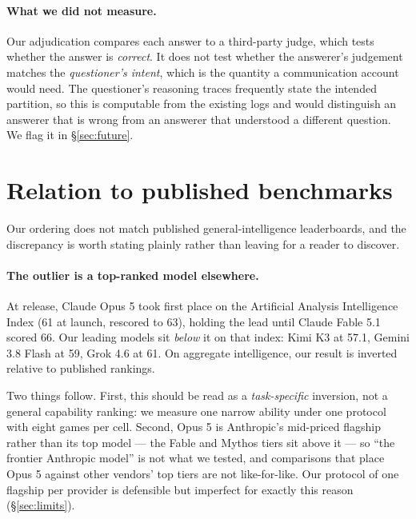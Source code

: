 \documentclass[11pt]{article}
\begin{document}
\paragraph{What we did not measure.} Our adjudication compares each answer to a
third-party judge, which tests whether the answer is \emph{correct}. It does not
test whether the answerer's judgement matches the \emph{questioner's intent},
which is the quantity a communication account would need. The questioner's
reasoning traces frequently state the intended partition, so this is computable
from the existing logs and would distinguish an answerer that is wrong from an
answerer that understood a different question. We flag it in
\S\ref{sec:future}.

\section{Relation to published benchmarks}
\label{sec:external}

Our ordering does not match published general-intelligence leaderboards, and
the discrepancy is worth stating plainly rather than leaving for a reader to
discover.

\paragraph{The outlier is a top-ranked model elsewhere.} At release, Claude Opus 5 took first place on the Artificial Analysis Intelligence Index
(61 at launch, rescored to 63), holding the lead until Claude Fable 5.1 scored
66. Our leading models sit \emph{below} it on that index: Kimi K3 at 57.1,
Gemini 3.8 Flash at 59, Grok 4.6 at 61. On aggregate intelligence, our result
is inverted relative to published rankings.

Two things follow. First, this should be read as a \emph{task-specific}
inversion, not a general capability ranking: we measure one narrow ability
under one protocol with eight games per cell. Second, Opus 5 is Anthropic's
mid-priced flagship rather than its top model --- the Fable and Mythos tiers sit
above it --- so ``the frontier Anthropic model'' is not what we tested, and
comparisons that place Opus 5 against other vendors' top tiers are not
like-for-like. Our protocol of one flagship per provider is defensible but
imperfect for exactly this reason (\S\ref{sec:limits}).
\end{document}
